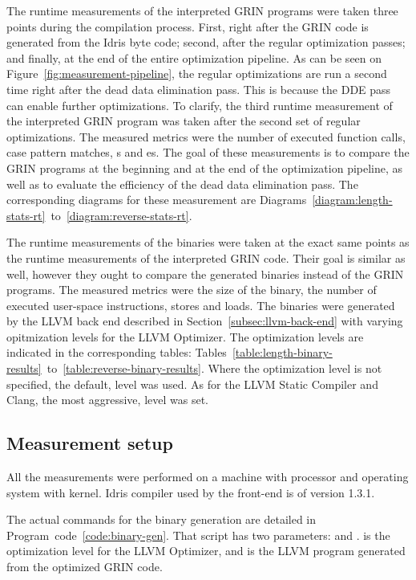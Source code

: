 \documentclass[main.tex]{subfiles}
\begin{document}
	The runtime measurements of the interpreted GRIN programs were taken three points during the compilation process. First, right after the GRIN code is generated from the Idris byte code; second, after the regular optimization passes; and finally, at the end of the entire optimization pipeline. As can be seen on Figure~\ref{fig:measurement-pipeline}, the regular optimizations are run a second time right after the dead data elimination pass. This is because the DDE pass can enable further optimizations. To clarify, the third runtime measurement of the interpreted GRIN program was taken after the second set of regular optimizations. The measured metrics were the number of executed function calls, case pattern matches, s and es. The goal of these measurements is to compare the GRIN programs at the beginning and at the end of the optimization pipeline, as well as to evaluate the efficiency of the dead data elimination pass. The corresponding diagrams for these measurement are Diagrams~\ref{diagram:length-stats-rt}~to~\ref{diagram:reverse-stats-rt}.

	The runtime measurements of the binaries were taken at the exact same points as the runtime measurements of the interpreted GRIN code. Their goal is similar as well, however they ought to compare the generated binaries instead of the GRIN programs. The measured metrics were the size of the binary, the number of executed user-space instructions, stores and loads. The binaries were generated by the LLVM back end described in Section~\ref{subsec:llvm-back-end} with varying opitmization levels for the LLVM Optimizer. The optimization levels are indicated in the corresponding tables: Tables~\ref{table:length-binary-results}~to~\ref{table:reverse-binary-results}. Where the optimization level is not specified, the default,  level was used. As for the LLVM Static Compiler and Clang, the most aggressive,  level was set.
	
	\subsection{Measurement setup}
	
	All the measurements were performed on a machine with  processor and  operating system with  kernel. Idris compiler used by the front-end is of version 1.3.1.
	
	The actual commands for the binary generation are detailed in Program~code~\ref{code:binary-gen}. That script has two parameters:  and .  is the optimization level for the LLVM Optimizer, and  is the LLVM program generated from the optimized GRIN code.
	
\end{document}
